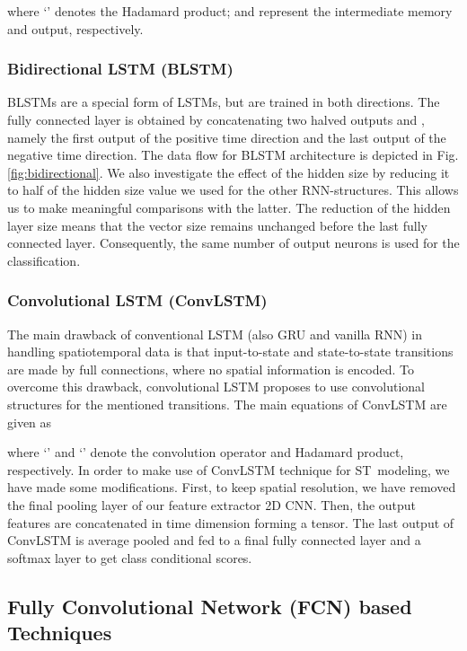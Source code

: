 \documentclass[runningheads]{llncs}
\begin{document}
\noindent where `' denotes the Hadamard product;  and  represent the intermediate memory and output, respectively.


\subsubsection{Bidirectional LSTM (BLSTM)}
BLSTMs \cite{schuster1997bidirectional} are a special form of LSTMs, but are trained in both directions. The fully connected layer is obtained by concatenating two halved outputs  and , namely the first output of the positive time direction and the last output of the negative time direction. The data flow for BLSTM architecture is depicted in Fig. \ref{fig:bidirectional}. We also investigate the effect of the hidden size by reducing it to half of the hidden size value we used for the other RNN-structures. This allows us to make meaningful comparisons with the latter. The reduction of the hidden layer size means that the vector size remains unchanged before the last fully connected layer. Consequently, the same number of output neurons is used for the classification. 



\subsubsection{Convolutional LSTM (ConvLSTM)}
The main drawback of conventional LSTM (also GRU and vanilla RNN) in handling spatiotemporal data is that input-to-state and state-to-state transitions are made by full connections, where no spatial information is encoded. To overcome this drawback, convolutional LSTM proposes to use convolutional structures for the mentioned transitions. The main equations of ConvLSTM are given as

\noindent where `' and `' denote the convolution operator and Hadamard product, respectively. In order to make use of ConvLSTM technique for ST~modeling, we have made some modifications. First, to keep spatial resolution, we have removed the final pooling layer of our feature extractor 2D CNN. Then, the output features are concatenated in time dimension forming a  tensor. The last output of ConvLSTM is average pooled and fed to a final fully connected layer and a softmax layer to get class conditional scores.


\subsection{Fully Convolutional Network (FCN) based Techniques}
\label{fcnsk}
\end{document}
